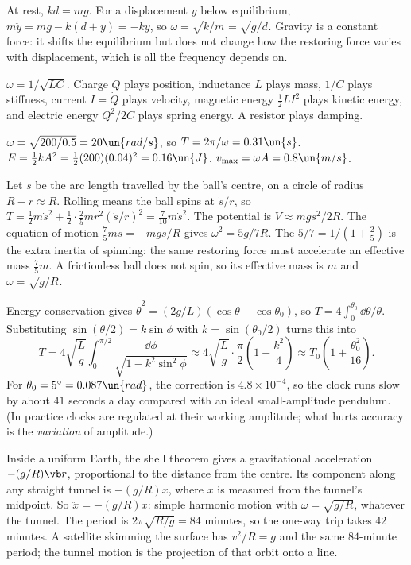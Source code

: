 
 At rest, $kd = mg$. For a displacement $y$ below equilibrium, $m\ddot y = mg - k(d+y) = -ky$, so $\omega = \sqrt{k/m} = \sqrt{g/d}$. Gravity is a constant force: it shifts the equilibrium but does not change how the restoring force varies with displacement, which is all the frequency depends on.

 $\omega = 1/\sqrt{LC}$. Charge $Q$ plays position, inductance $L$ plays mass, $1/C$ plays stiffness, current $I = \dot Q$ plays velocity, magnetic energy $\tfrac12LI^2$ plays kinetic energy, and electric energy $Q^2/2C$ plays spring energy. A resistor plays damping.

 $\omega = \sqrt{200/0.5} = 20\un{rad/s}$, so $T = 2\pi/\omega = 0.31\un{s}$. $E = \tfrac12kA^2 = \tfrac12(200)(0.04)^2 = 0.16\un{J}$. $v_{\max} = \omega A = 0.8\un{m/s}$.

 Let $s$ be the arc length travelled by the ball's centre, on a circle of radius $R - r\approx R$. Rolling means the ball spins at $\dot s/r$, so $T = \tfrac12m\dot s^2 + \tfrac12\cdot\tfrac25mr^2(\dot s/r)^2 = \tfrac{7}{10}m\dot s^2$. The potential is $V\approx mgs^2/2R$. The equation of motion $\tfrac75m\ddot s = -mgs/R$ gives $\omega^2 = 5g/7R$. The $5/7 = 1/(1+\tfrac25)$ is the extra inertia of spinning: the same restoring force must accelerate an effective mass $\tfrac75m$. A frictionless ball does not spin, so its effective mass is $m$ and $\omega = \sqrt{g/R}$.

 Energy conservation gives $\dot\theta^2 = (2g/L)(\cos\theta-\cos\theta_0)$, so $T = 4\int_0^{\theta_0}\dd\theta/\dot\theta$. Substituting $\sin(\theta/2) = k\sin\phi$ with $k = \sin(\theta_0/2)$ turns this into
\[
  T = 4\sqrt{\frac Lg}\int_0^{\pi/2}\frac{\dd\phi}{\sqrt{1-k^2\sin^2\phi}}\approx4\sqrt{\frac Lg}\cdot\frac\pi2\left(1 + \frac{k^2}{4}\right)\approx T_0\left(1+\frac{\theta_0^2}{16}\right).
\]
For $\theta_0 = 5^\circ = 0.087\un{rad}$, the correction is $4.8\times10^{-4}$, so the clock runs slow by about $41$ seconds a day compared with an ideal small-amplitude pendulum. (In practice clocks are regulated at their working amplitude; what hurts accuracy is the \emph{variation} of amplitude.)

 Inside a uniform Earth, the shell theorem gives a gravitational acceleration $-(g/R)\vb r$, proportional to the distance from the centre. Its component along any straight tunnel is $-(g/R)x$, where $x$ is measured from the tunnel's midpoint. So $\ddot x = -(g/R)x$: simple harmonic motion with $\omega = \sqrt{g/R}$, whatever the tunnel. The period is $2\pi\sqrt{R/g} = 84$ minutes, so the one-way trip takes $42$ minutes. A satellite skimming the surface has $v^2/R = g$ and the same $84$-minute period; the tunnel motion is the projection of that orbit onto a line.

